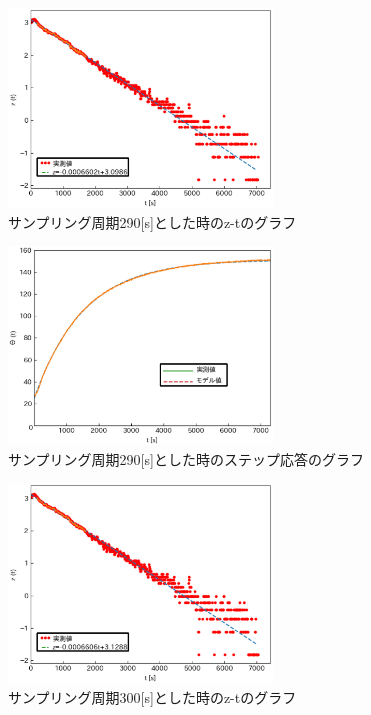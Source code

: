 \documentclass[12pt]{jsarticle}
\begin{document}
\begin{figure}[H]
  \begin{center}
    \includegraphics[clip,width=7.0cm]{../graph/z-t290s.eps}
    \caption{サンプリング周期290[s]とした時のz-tのグラフ}
    \label{z-t_h1=290s}
  \end{center}
\end{figure}
\begin{figure}[H]
  \begin{center}
    \includegraphics[clip,width=7.0cm]{../graph/step_response290s.eps}
    \caption{サンプリング周期290[s]とした時のステップ応答のグラフ}
    \label{step_response290s}
  \end{center}
\end{figure}
\begin{figure}[H]
  \begin{center}
    \includegraphics[clip,width=7.0cm]{../graph/z-t300s.eps}
    \caption{サンプリング周期300[s]とした時のz-tのグラフ}
    \label{z-t_h1=300s}
  \end{center}
\end{figure}
\end{document}
